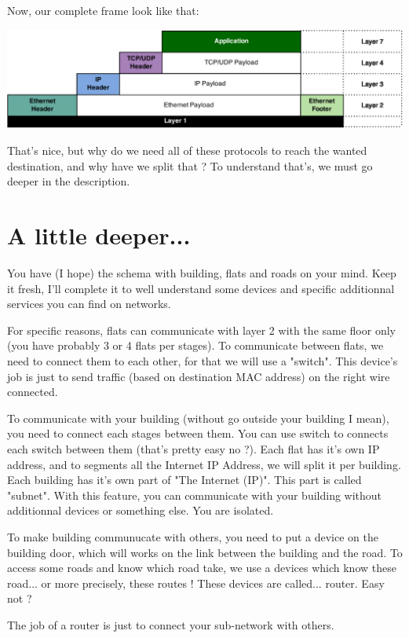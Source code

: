 \documentclass{article}
\begin{document}
	Now, our complete frame look like that:
	\begin{center}
	\includegraphics[scale=0.3]{content/layer7.eps}
	\end{center}
	
	That's nice, but why do we need all of these protocols to reach the wanted destination, and why have we split that ?
	To understand that's, we must go deeper in the description.

\section{A little deeper...}
	You have (I hope) the schema with building, flats and roads on your mind. Keep it fresh, I'll complete it to well
	understand some devices and specific additionnal services you can find on networks.
	
	For specific reasons, flats can communicate with layer 2 with the same floor only (you have probably 3 or 4 flats
	per stages). To communicate between flats, we need to connect them to each other, for that we will use a "switch".
	This device's job is just to send traffic (based on destination MAC address) on the right wire connected.
	
	To communicate with your building (without go outside your building I mean), you need to connect each stages between
	them. You can use switch to connects each switch between them (that's pretty easy no ?). Each flat has it's own
	IP address, and to segments all the Internet IP Address, we will split it per building. Each building has it's own
	part of "The Internet (IP)". This part is called "subnet". With this feature, you can communicate with your building
	without additionnal devices or something else. You are isolated.
	
	To make building communucate with others, you need to put a device on the building door, which will works on the
	link between the building and the road. To access some roads and know which road take, we use a devices
	which know these road... or more precisely, these routes ! These devices are called... router. Easy not ?
	
	The job of a router is just to connect your sub-network with others.
	
\end{document}
